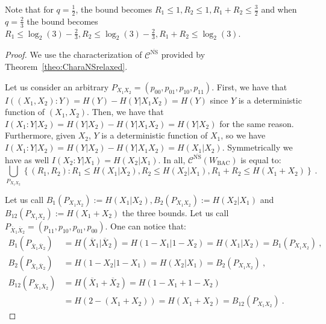   \begin{rk}
    Note that for $q=\frac{1}{2}$, the bound becomes $R_1 \leq 1, R_2 \leq 1, R_1+R_2 \leq \frac{3}{2}$ and when $q=\frac{2}{3}$ the bound becomes $R_1 \leq \log_2(3)-\frac{2}{3}, R_2 \leq \log_2(3)-\frac{2}{3}, R_1+R_2 \leq \log_2(3)$.
  \end{rk}
  
  \begin{proof}
    We use the characterization of $\mathcal{C}^{\overline{\mathrm{NS}}}$ provided by Theorem~\ref{theo:CharaNSrelaxed}.

    Let us consider an arbitrary $P_{X_1X_2}=(p_{00},p_{01},p_{10},p_{11})$. First, we have that $I((X_1,X_2):Y) = H(Y) - H(Y|X_1X_2) = H(Y)$ since $Y$ is a deterministic function of $(X_1,X_2)$. Then, we have that $I(X_1:Y|X_2) = H(Y|X_2) - H(Y|X_1X_2) = H(Y|X_2)$ for the same  reason. Furthermore, given $X_2$, $Y$  is a deterministic function of $X_1$, so we have $I(X_1:Y|X_2) = H(Y|X_2) - H(Y|X_1X_2) = H(X_1|X_2)$. Symmetrically we have as well $I(X_2:Y|X_1) = H(X_2|X_1)$. In all, $\mathcal{C}^{\overline{\mathrm{NS}}}(W_{\text{BAC}})$ is equal to:
    \[ \bigcup_{P_{X_1X_2}}\left\{ (R_1,R_2) : R_1 \leq H(X_1|X_2), R_2 \leq H(X_2|X_1), R_1+R_2 \leq H(X_1+X_2)\right\} \ . \]
    
    Let us call $B_1(P_{X_1X_2}):=H(X_1|X_2),B_2(P_{X_1X_2}):=H(X_2|X_1)$ and $B_{12}(P_{X_1X_2}):=H(X_1+X_2)$ the three bounds. Let us call $P_{\overline{X}_1\overline{X}_2}=(p_{11},p_{10},p_{01},p_{00})$. One can notice that:
    \begin{equation}
      \begin{aligned}
        B_1(P_{\overline{X}_1\overline{X}_2}) &= H(\overline{X}_1|\overline{X}_2) = H(1-X_1|1-X_2) = H(X_1|X_2) = B_1(P_{X_1X_2}) \ ,\\
        B_2(P_{\overline{X}_1\overline{X}_2}) &= H(1-X_2|1-X_1) = H(X_2|X_1) = B_2(P_{X_1X_2}) \ ,\\
        B_{12}(P_{\overline{X}_1\overline{X}_2}) &= H(\overline{X}_1+\overline{X}_2) = H(1-X_1+1-X_2)\\
        &= H(2-(X_1+X_2))=H(X_1+X_2) = B_{12}(P_{X_1X_2}) \ .
      \end{aligned}
    \end{equation}   
    

\end{proof}
